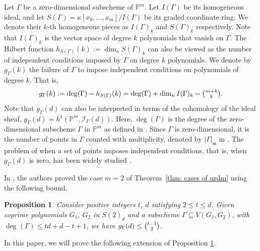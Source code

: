 \documentclass[11pt]{amsart}
\newtheorem{proposition}[theorem]{Proposition}
\theoremstyle{definition}
\newcommand{\PP}{\mathbb{P}}
\newcommand{\sg}{S(\Gamma)}
\newcommand{\dimk}{\dim_{\kappa}}
\newcommand{\gG}{g_{\Gamma}}
\begin{document}
Let $\Gamma$ be a zero-dimensional subscheme of $\PP^m$.
Let $I(\Gamma)$ be its homogeneous ideal, and let $S(\Gamma)=\kappa[x_0,\dots,x_m]/I(\Gamma)$ be its graded coordinate ring.
We denote their $k$-th homogeneous pieces as $I(\Gamma)_k$ and $S(\Gamma)_k$ respectively.
Note that $I(\Gamma)_k$ is the vector space of degree $k$ polynomials that vanish on $\Gamma$. 
The Hilbert function $h_{\sg}(k):=\dimk S(\Gamma)_k$ can also be viewed as the number of independent conditions imposed by $\Gamma$ on degree $k$ polynomials.
We denote by $g_{\Gamma}(k)$ the failure of $\Gamma$ to impose independent conditions on polynomials of degree $k$. That is,
\[
g_{\Gamma}(k)
:=\deg(\Gamma)-h_{\sg}(k) 
=\deg(\Gamma)+\dimk I(\Gamma)_k-\tbinom{m+k}{k}.
\]
Note that $g_{\Gamma}(d)$ can also be interpreted in terms of the cohomology of the ideal sheaf, $g_{\Gamma}(d)=h^1(\PP^m,\mathcal{I}_\Gamma(d))$.
Here, $\deg(\Gamma)$ is the degree of the zero-dimensional subscheme $\Gamma$ in $\PP^m$ as defined in \cite[Section 1.7]{hartshorne2013algebraic}. Since $\Gamma$ is zero-dimensional, it is the number of points in $\Gamma$ counted with multiplicity, denoted by $|\Gamma|_{\mathfrak{m}}$ in \cite[Definition 2.1]{lin2026largest}.
The problem of when a set of points imposes independent conditions, that is, when $g_{\Gamma}(d)$ is zero, has been widely studied \cite{ballico2014zero, ballico2013gaps, caviglia2021cayley, couvreur2012dual, gold2005cayley, lin2026largest, moreno2026generalized}.

In \cite{lin2026largest}, the authors proved the case $m=2$ of Theorem~\ref{thm: cases of urdm} using the following bound.

\begin{proposition}{\cite[Lemma 5.2, Proposition 5.6]{lin2026largest}}\label{Prop: cond on gx udr}
Consider positive integers $t$, $d$ satisfying $2\leq t\leq d$.
Given coprime polynomials $G_1$, $G_2$ in $S(2)_d$ and a subscheme $\Gamma\subseteq V(G_1,G_2)$, with $\deg(\Gamma)\leq td+d-t+1$, we have $g_{\Gamma}(d)\leq \tbinom{t-1}{2}$.
\end{proposition}

In this paper, we will prove the following extension of Proposition \ref{Prop: cond on gx udr}.
\end{document}
